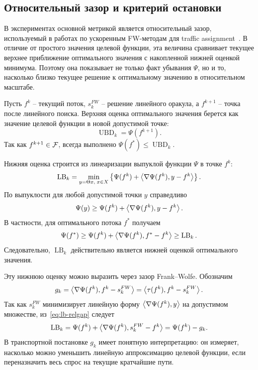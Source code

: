 \subsection{Относительный зазор и критерий остановки}

В экспериментах основной метрикой является относительный зазор, используемый в работах по
ускоренным FW-методам для traffic assignment~\cite{mitradjieva2013stiff,arrache2008accelerating}.
В отличие от простого значения целевой функции, эта величина сравнивает текущее верхнее
приближение оптимального значения с накопленной нижней оценкой минимума.
Поэтому она показывает не только факт убывания $\Psi$, но и то, насколько близко текущее
решение к оптимальному значению в относительном масштабе.

Пусть $f^k$ -- текущий поток, $s_k^{FW}$ -- решение линейного оракула, а $f^{k+1}$ -- точка
после линейного поиска.
Верхняя оценка оптимального значения берется как значение целевой функции в новой допустимой
точке:
\begin{equation}
    \operatorname{UBD}_k=\Psi(f^{k+1}).
    \label{eq:ubd-relgap}
\end{equation}
Так как $f^{k+1}\in\mathcal{F}$, всегда выполнено
$\Psi(f^\ast)\leq \operatorname{UBD}_k$.

Нижняя оценка строится из линеаризации выпуклой функции $\Psi$ в точке $f^k$:
\begin{equation}
    \operatorname{LB}_k
    =
    \min_{y=\Theta x,\;x\in X}
    \left\{
        \Psi(f^k)+\left\langle \nabla\Psi(f^k), y-f^k \right\rangle
    \right\}.
    \label{eq:lb-relgap}
\end{equation}
По выпуклости для любой допустимой точки $y$ справедливо
\[
    \Psi(y)\geq \Psi(f^k)+\left\langle \nabla\Psi(f^k), y-f^k \right\rangle.
\]
В частности, для оптимального потока $f^\ast$ получаем
\[
    \Psi(f^\ast)
    \geq
    \Psi(f^k)+\left\langle \nabla\Psi(f^k), f^\ast-f^k \right\rangle
    \geq
    \operatorname{LB}_k.
\]
Следовательно, $\operatorname{LB}_k$ действительно является нижней оценкой оптимального
значения.

Эту нижнюю оценку можно выразить через зазор Frank--Wolfe.
Обозначим
\begin{equation}
    g_k
    =
    \left\langle \nabla\Psi(f^k), f^k-s_k^{FW} \right\rangle
    =
    \left\langle \tau(f^k), f^k-s_k^{FW} \right\rangle.
    \label{eq:fw-gap-relgap-section}
\end{equation}
Так как $s_k^{FW}$ минимизирует линейную форму $\left\langle \nabla\Psi(f^k), y \right\rangle$ на допустимом
множестве, из~\eqref{eq:lb-relgap} следует
\begin{equation}
    \operatorname{LB}_k
    =
    \Psi(f^k)+\left\langle \nabla\Psi(f^k), s_k^{FW}-f^k \right\rangle
    =
    \Psi(f^k)-g_k.
    \label{eq:lb-fw-gap}
\end{equation}
В транспортной постановке $g_k$ имеет понятную интерпретацию: он измеряет, насколько можно
уменьшить линейную аппроксимацию целевой функции, если переназначить весь спрос на текущие
кратчайшие пути.

